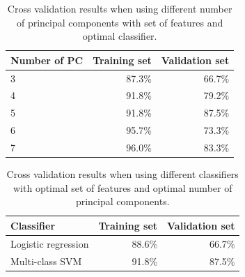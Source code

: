 \begin{table}
\begin{center}
\begin{tabular}{| l | r | r |}
\hline
Number of PC & Training set & Validation set \\ \hline
3 & 87.3\% & 66.7\% \\
4 & 91.8\% & 79.2\% \\
5 & 91.8\% & 87.5\% \\
6 & 95.7\% & 73.3\% \\
7 & 96.0\% & 83.3\% \\
\hline
\end{tabular}
\end{center}
\caption{Cross validation results when using different number of principal components with set of features and optimal classifier.}
\label{tab:pca}
\end{table}

\begin{table}
\begin{center}
\begin{tabular}{| l | r | r |}
\hline
Classifier & Training set & Validation set \\ \hline
Logistic regression & 88.6\% & 66.7\% \\
Multi-class SVM & 91.8\% & 87.5\% \\
\hline
\end{tabular}
\end{center}
\caption{Cross validation results when using different classifiers with optimal set of features and optimal number of principal components.}
\label{tab:classify}
\end{table}
